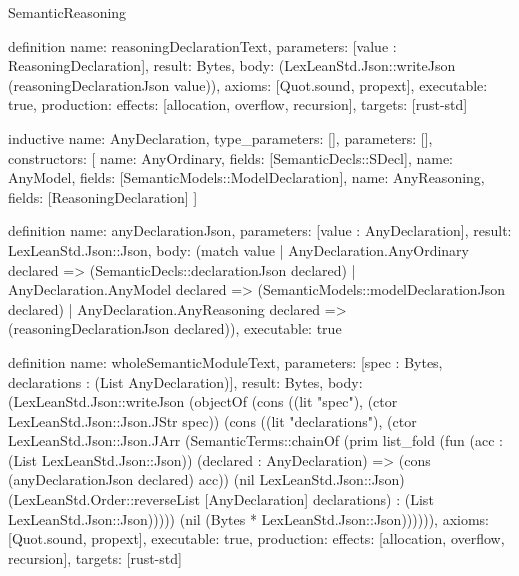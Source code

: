 \begin{lexlean}{SemanticReasoning}
\begin{semanticmodule}
definition{
  name: reasoningDeclarationText,
  parameters: [value : ReasoningDeclaration],
  result: Bytes,
  body: (LexLeanStd.Json::writeJson (reasoningDeclarationJson value)),
  axioms: [Quot.sound, propext],
  executable: true,
  production: {effects: [allocation, overflow, recursion], targets: [rust-std]}
}

inductive{
  name: AnyDeclaration,
  type_parameters: [],
  parameters: [],
  constructors: [
    {name: AnyOrdinary, fields: [SemanticDecls::SDecl]},
    {name: AnyModel, fields: [SemanticModels::ModelDeclaration]},
    {name: AnyReasoning, fields: [ReasoningDeclaration]}
  ]
}

definition{
  name: anyDeclarationJson,
  parameters: [value : AnyDeclaration],
  result: LexLeanStd.Json::Json,
  body: (match value
    | AnyDeclaration.AnyOrdinary declared => (SemanticDecls::declarationJson declared)
    | AnyDeclaration.AnyModel declared => (SemanticModels::modelDeclarationJson declared)
    | AnyDeclaration.AnyReasoning declared => (reasoningDeclarationJson declared)),
  executable: true
}

definition{
  name: wholeSemanticModuleText,
  parameters: [spec : Bytes, declarations : (List AnyDeclaration)],
  result: Bytes,
  body: (LexLeanStd.Json::writeJson (objectOf (cons ((lit "spec"), (ctor LexLeanStd.Json::Json.JStr spec)) (cons ((lit "declarations"), (ctor LexLeanStd.Json::Json.JArr (SemanticTerms::chainOf (prim list_fold (fun (acc : (List LexLeanStd.Json::Json)) (declared : AnyDeclaration) => (cons (anyDeclarationJson declared) acc)) (nil LexLeanStd.Json::Json) (LexLeanStd.Order::reverseList [AnyDeclaration] declarations) : (List LexLeanStd.Json::Json))))) (nil (Bytes * LexLeanStd.Json::Json)))))),
  axioms: [Quot.sound, propext],
  executable: true,
  production: {effects: [allocation, overflow, recursion], targets: [rust-std]}
}
\end{semanticmodule}
\end{lexlean}
